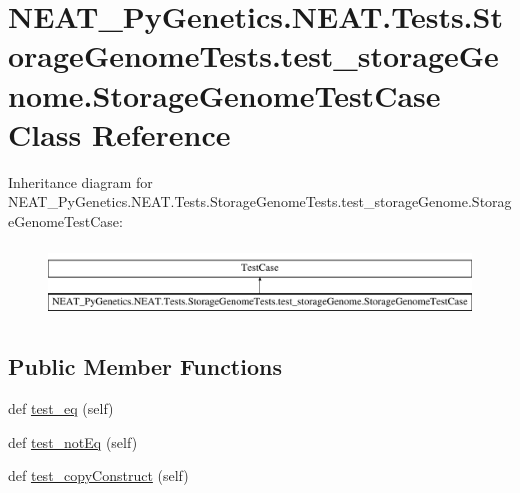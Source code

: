 \hypertarget{classNEAT__PyGenetics_1_1NEAT_1_1Tests_1_1StorageGenomeTests_1_1test__storageGenome_1_1StorageGenomeTestCase}{}\section{N\+E\+A\+T\+\_\+\+Py\+Genetics.\+N\+E\+A\+T.\+Tests.\+Storage\+Genome\+Tests.\+test\+\_\+storage\+Genome.\+Storage\+Genome\+Test\+Case Class Reference}
\label{classNEAT__PyGenetics_1_1NEAT_1_1Tests_1_1StorageGenomeTests_1_1test__storageGenome_1_1StorageGenomeTestCase}
Inheritance diagram for N\+E\+A\+T\+\_\+\+Py\+Genetics.\+N\+E\+A\+T.\+Tests.\+Storage\+Genome\+Tests.\+test\+\_\+storage\+Genome.\+Storage\+Genome\+Test\+Case\+:\begin{figure}[H]
\begin{center}
\leavevmode
\includegraphics[height=1.927711cm]{classNEAT__PyGenetics_1_1NEAT_1_1Tests_1_1StorageGenomeTests_1_1test__storageGenome_1_1StorageGenomeTestCase}
\end{center}
\end{figure}
\subsection*{Public Member Functions}
\begin{DoxyCompactItemize}
\item 
def \hyperlink{classNEAT__PyGenetics_1_1NEAT_1_1Tests_1_1StorageGenomeTests_1_1test__storageGenome_1_1StorageGenomeTestCase_a27b58493e931470520a1e71e514009cb}{test\+\_\+eq} (self)
\item 
def \hyperlink{classNEAT__PyGenetics_1_1NEAT_1_1Tests_1_1StorageGenomeTests_1_1test__storageGenome_1_1StorageGenomeTestCase_a01f81b00e989464c932df722135daf5c}{test\+\_\+not\+Eq} (self)
\item 
def \hyperlink{classNEAT__PyGenetics_1_1NEAT_1_1Tests_1_1StorageGenomeTests_1_1test__storageGenome_1_1StorageGenomeTestCase_a4c670f9b3e78d2be50280880f1de23d5}{test\+\_\+copy\+Construct} (self)
\end{DoxyCompactItemize}


